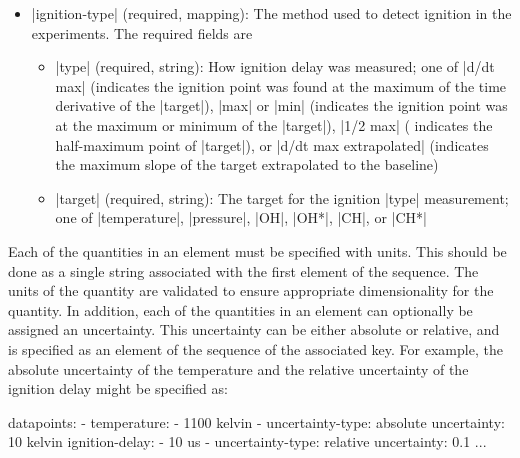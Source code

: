\documentclass[12pt]{ijck}
\begin{document}
\begin{itemize}
\begin{itemize}
\begin{itemize}
        \end{itemize}
    \end{itemize}
    \item \yabox|ignition-type| (required, mapping): The method used to detect
    ignition in the experiments. The required fields are
    \begin{itemize}
        \item \yabox|type| (required, string): How ignition delay was
        measured; one of \yabox|d/dt max| (indicates the ignition point was
        found at the maximum of the time derivative of the \yabox|target|),
        \yabox|max| or \yabox|min| (indicates the ignition point was at the
        maximum or minimum of the \yabox|target|), \yabox|1/2 max| (
        indicates the half-maximum point of \yabox|target|), or \yabox|d/dt max extrapolated|
        (indicates the maximum slope of the target extrapolated to the baseline)
        \item \yabox|target| (required, string): The target for the ignition
        \yabox|type| measurement; one of \yabox|temperature|, \yabox|pressure|,
        \yabox|OH|, \yabox|OH*|, \yabox|CH|, or \yabox|CH*|
    \end{itemize}
\end{itemize}

Each of the
quantities in an element must be specified with units. This should be done as a
single string associated with the first element of the sequence. The units of
the quantity are validated to ensure appropriate dimensionality
for the quantity. In addition, each of the quantities in an element can
optionally be assigned an uncertainty. This uncertainty can be either absolute
or relative, and is specified as an element of the sequence of the associated key.
For example, the absolute uncertainty of the temperature and the relative
uncertainty of the ignition delay might be specified as:
%
\begin{yamlbox}
datapoints:
  - temperature:
      - 1100 kelvin
      - uncertainty-type: absolute
        uncertainty: 10 kelvin
    ignition-delay:
      - 10 us
      - uncertainty-type: relative
        uncertainty: 0.1
    ...
\end{yamlbox}
\end{document}
